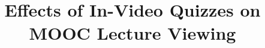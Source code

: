 \documentclass{sigchi}
\begin{document}
\title{Effects of In-Video Quizzes on MOOC Lecture Viewing}

\author{%
  \\
  \\
  \\
}

\maketitle
\end{document}
